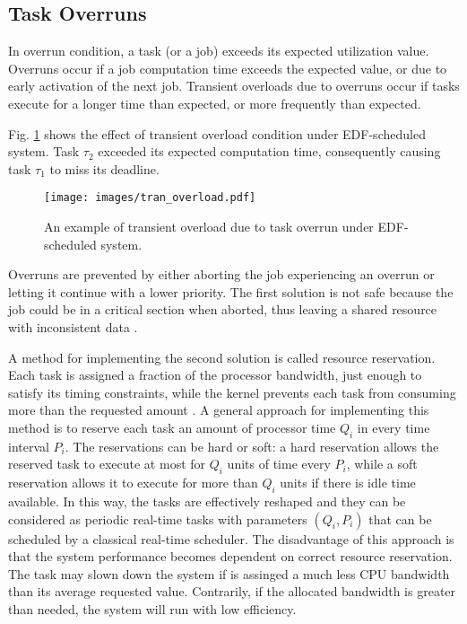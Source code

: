 \subsection{Task Overruns}
In overrun condition, a task (or a job) exceeds its expected utilization value.
Overruns occur if a job computation time exceeds the expected value, or due to early activation of the next job.
Transient overloads due to overruns occur if tasks execute for a longer time than expected, or more frequently than expected.

Fig. \ref{transient_EDF} shows the effect of transient overload condition under EDF-scheduled system. Task $\tau_2$ exceeded its expected computation time, consequently causing task $\tau_1$ to miss its deadline.
\begin{figure}[ht]
    \centering
    \texttt{[image: images/tran\_overload.pdf]}
    \caption{An example of transient overload due to task overrun under EDF-scheduled system.}
    \label{transient_EDF}
\end{figure}

Overruns are prevented by either aborting the job experiencing an overrun or letting it continue with a lower priority. 
The first solution is not safe because the job could be in a critical section when aborted, thus leaving a shared resource with inconsistent data 
\cite{buttazzo2011hard}. 

A method for implementing the second solution is called resource reservation.
Each task is assigned a fraction of the processor bandwidth, just enough to satisfy its timing constraints, while the kernel prevents each task from consuming more than the requested amount \cite{buttazzo2011hard}. 
A general approach for implementing this method is to reserve each task an amount of processor time $Q_i$ in every time interval $P_i$. 
The reservations can be hard or soft: a hard reservation allows the reserved task to execute at most for $Q_i$ units of time every $P_i$, while a soft reservation allows it to execute for more than $Q_i$ units if there is idle time available. 
In this way, the tasks are effectively reshaped and they can be considered as 
periodic real-time tasks with parameters \( (Q_i, P_i) \) that can be scheduled by a classical real-time scheduler.
The disadvantage of this approach is that the system performance becomes dependent on correct resource reservation. The task may slown down the system if is assinged a much less CPU bandwidth than its average requested value. Contrarily, if the allocated bandwidth is greater than needed, the system will run with low efficiency.

